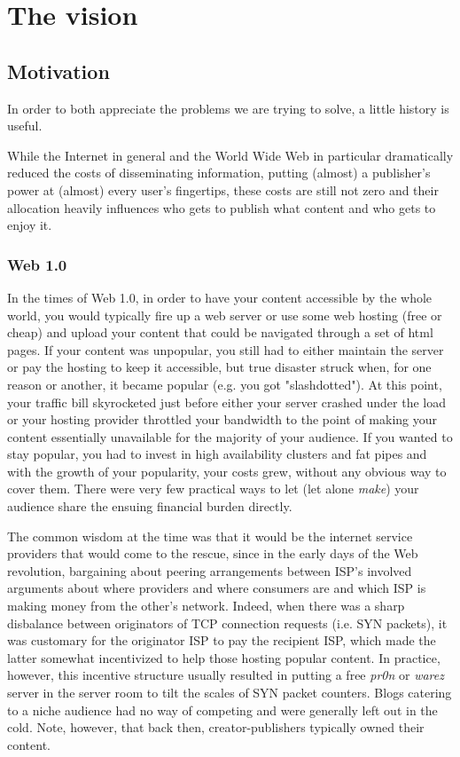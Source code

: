 \chapter{The vision}\label{chap:vision}

 

\section{Motivation}

In order to both appreciate the problems we are trying to solve, a little history is useful.

While the Internet in general and the World Wide Web in particular dramatically reduced the costs of disseminating information, putting (almost) a publisher's power at (almost) every user's fingertips, these costs are still not zero and their allocation heavily influences who gets to publish what content and who gets to enjoy it.

\subsection{Web 1.0}

In the times of Web 1.0, in order to have your content accessible by the whole world, you would typically fire up a web server or use some web hosting (free or cheap) and upload your content that could be navigated through a set of html pages. If your content was unpopular, you still had to either maintain the server or pay the hosting to keep it accessible, but true disaster struck when, for one reason or another, it became popular (e.g. you got "slashdotted"). At this point, your traffic bill skyrocketed just before either your server crashed under the load or your hosting provider throttled your bandwidth to the point of making your content essentially unavailable for the majority of your audience. If you wanted to stay popular, you had to invest in high availability clusters and fat pipes and with the growth of your popularity, your costs grew, without any obvious way to cover them. There were very few practical ways to let (let alone \emph{make}) your audience share the ensuing financial burden directly.

The common wisdom at the time was that it would be the internet service providers that would come to the rescue, since in the early days of the Web revolution, bargaining about peering arrangements between ISP's involved arguments about where providers and where consumers are and which ISP is making money from the other's network. Indeed, when there was a sharp disbalance between originators of TCP connection requests (i.e. SYN packets), it was customary for the originator ISP to pay the recipient ISP, which made the latter somewhat incentivized to help those hosting popular content. In practice, however, this incentive structure usually resulted in putting a free \emph{pr0n} or \emph{warez} server in the server room to tilt the scales of SYN packet counters. Blogs catering to a niche audience had no way of competing and were generally left out in the cold. Note, however, that back then, creator-publishers typically owned their content.

